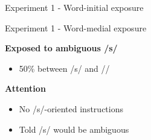 \documentclass{beamer}
\begin{document}
\begin{frame}{Experiment 1 - Word-initial exposure}
\end{frame}

\begin{frame}{Experiment 1 - Word-medial exposure}

\begin{minipage}{0.45\textwidth}
\textbf{Exposed to ambiguous /s/}
\begin{itemize}
\item 50\% between /s/ and /\textesh/
\end{itemize}

\textbf{Attention}
\begin{itemize}
\item No /s/-oriented instructions
\item Told /s/ would be ambiguous
\end{itemize}


\end{minipage}
\end{frame}
\end{document}
